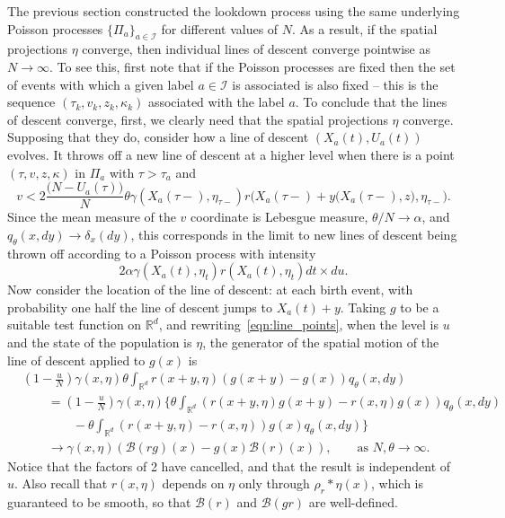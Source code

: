 \documentclass[EJP]{ejpecp} %
\newcommand{\IR}{\mathbb R}
\newcommand{\DG}{\mathcal{B}}  %
\newcommand{\kernel}{\rho}  %
\newcommand{\smooth}[1]{\kernel_{#1} \! * \!}  %
\newcommand{\labelspace}{\mathcal{I}} %
\begin{document}
The previous section constructed the lookdown process
using the same underlying Poisson processes $\{\Pi_a\}_{a \in \labelspace}$ for
different values of $N$.
As a result, if the spatial projections $\eta$ converge, then
individual lines of descent converge pointwise as $N \to \infty$. 
To see this, first note that if the Poisson processes are fixed
then the set of events with which a given label $a \in \labelspace$ is associated
is also fixed -- this is the sequence $(\tau_k, v_k, z_k, \kappa_k)$ associated 
with the label $a$.
To conclude that the lines of descent converge, 
first, we clearly need that the spatial projections $\eta$ converge.
%
Supposing that they do,
consider how a line of descent $(X_a(t), U_a(t))$ evolves.
It throws off a new line of descent at a higher level
when there is a point $(\tau, v, z, \kappa)$ in $\Pi_a$ with $\tau > \tau_a$ and
\begin{equation} \label{eqn:line_points}
    v < 2 \frac{\big(N - U_a(\tau)\big)}{N} \theta \gamma(X_a(\tau-), \eta_{\tau-}) 
	r\Big(X_a(\tau-) + y\big(X_a(\tau-),z\big), \eta_{\tau-}\Big) .
\end{equation}
Since the mean measure of the $v$ coordinate is Lebesgue measure,
$\theta/N \to \alpha$,
and $q_\theta(x, dy) \to \delta_x(dy)$,
this corresponds in the limit to new lines of descent being thrown off 
according to a Poisson process with intensity
$$
2 \alpha \gamma(X_a(t), \eta_t) r(X_a(t), \eta_t)dt \times du.
$$
Now consider the location of the line of descent:
at each birth event, with probability one half
the line of descent jumps to $X_a(t) + y$.
Taking $g$ to be a suitable test function on $\IR^d$, 
and rewriting~\eqref{eqn:line_points}, when the level is $u$
and the state of the population is $\eta$, the generator of the
spatial motion of the line of descent
applied to $g(x)$ is
\begin{align*}
    &
    \left(1 - \frac{u}{N}\right) \gamma(x, \eta)
    \theta \int_{\IR^d} r(x+y, \eta) (g(x+y) - g(x)) q_\theta(x, dy) \\
    &\qquad {}
    =
    \left(1 - \frac{u}{N}\right) \gamma(x, \eta)
    \bigg\{
        \theta \int_{\IR^d} (r(x+y, \eta) g(x+y) - r(x, \eta) g(x)) q_\theta(x, dy) \\
        &\qquad \qquad {}
        -
        \theta \int_{\IR^d} (r(x+y, \eta) - r(x, \eta) ) g(x) q_\theta(x, dy) 
    \bigg\} \\
    &\qquad {}
    \to
    \gamma(x, \eta)
    \left(
        \DG(rg)(x) - g(x) \DG(r)(x)
    \right) ,
    \qquad \text{as } N, \theta \to \infty .
\end{align*}
Notice that the factors of 2 have cancelled,
and that the result is independent of $u$.
Also recall that $r(x, \eta)$ depends on $\eta$ only
through $\smooth{r}\eta(x)$,
which is guaranteed to be smooth, so that $\DG(r)$ 
and $\DG(gr)$ are well-defined.
\end{document}
